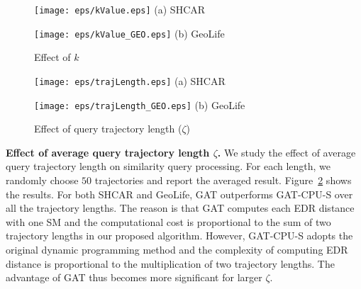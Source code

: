 \documentclass[10pt,conference,letterpaper]{IEEEtran}
\newcommand{\frname}{GAT\xspace }
\begin{document}

\begin{figure}[t]\centering
	\scriptsize{
		\begin{minipage}{0.48\linewidth}
			\centering
			\texttt{[image: eps/kValue.eps]}
			(a) SHCAR
		\end{minipage}
		\hfill
		\begin{minipage}{0.48\linewidth}
			\centering
			\texttt{[image: eps/kValue\_GEO.eps]}
			(b) GeoLife
		\end{minipage}
	}
	\caption{Effect of $k$ \label{fig:kValue}}
	\vspace{-.1in}
\end{figure}

\begin{figure}[t]\centering
	\scriptsize{
		\begin{minipage}{0.48\linewidth}
			\centering
			\texttt{[image: eps/trajLength.eps]}
			(a) SHCAR
		\end{minipage}
		\hfill
		\begin{minipage}{0.48\linewidth}
			\centering
			\texttt{[image: eps/trajLength\_GEO.eps]}
			(b) GeoLife
		\end{minipage}
	}
	\caption{Effect of query trajectory length ($\zeta$) \label{fig:LENSIMI}}
	\vspace{-.1in}
\end{figure}

\vspace{0.1cm}\textbf{Effect of average query trajectory length $\zeta$.}
We study the effect of average query trajectory length on similarity query processing. For each length, we randomly choose $50$ trajectories and report the averaged result.
Figure~\ref{fig:LENSIMI} shows the results.
For both SHCAR and GeoLife, \frname outperforms \frname-CPU-S over all the trajectory lengths. 
The reason is that \frname computes each EDR distance with one SM and the computational cost is proportional to the sum of two trajectory lengths in our proposed algorithm. 
However, \frname-CPU-S adopts the original dynamic programming method and the complexity of computing EDR distance is proportional to the multiplication of two trajectory lengths.
The advantage of \frname thus becomes more significant for larger $\zeta$.
\end{document}
